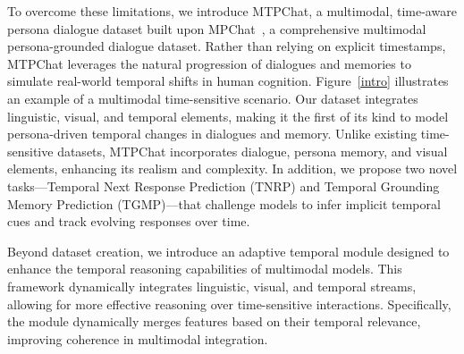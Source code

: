 To overcome these limitations, we introduce MTPChat, a multimodal, time-aware persona dialogue dataset built upon MPChat~\cite{ahn2023mpchat}, a comprehensive multimodal persona-grounded dialogue dataset. Rather than relying on explicit timestamps, MTPChat leverages the natural progression of dialogues and memories to simulate real-world temporal shifts in human cognition. Figure~\ref{intro} illustrates an example of a multimodal time-sensitive scenario. Our dataset integrates linguistic, visual, and temporal elements, making it the first of its kind to model persona-driven temporal changes in dialogues and memory. Unlike existing time-sensitive datasets, MTPChat incorporates dialogue, persona memory, and visual elements, enhancing its realism and complexity. In addition, we propose two novel tasks—Temporal Next Response Prediction (TNRP) and Temporal Grounding Memory Prediction (TGMP)—that challenge models to infer implicit temporal cues and track evolving responses over time. 





Beyond dataset creation, we introduce an adaptive temporal module designed to enhance the temporal reasoning capabilities of multimodal models. This framework dynamically integrates linguistic, visual, and temporal streams, allowing for more effective reasoning over time-sensitive interactions. Specifically, the module dynamically merges features based on their temporal relevance, improving coherence in multimodal integration.






